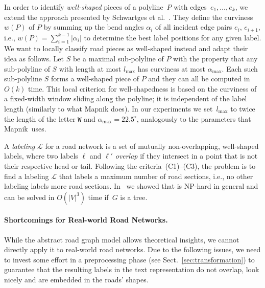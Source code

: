 \documentclass[a4paper,11pt]{article}
\begin{document}
In order to identify \emph{well-shaped} pieces of a polyline~$P$ with
edges~$e_1,\dots,e_k$, we extend the approach presented
by Schwartges et al.~\cite{swh-lsime-acm14}. They define the curviness $w(P)$
of $P$ by summing up the bend angles $\alpha_i$ of all incident edge pairs
$e_i$, $e_{i+1}$, i.e., $w(P)=\sum_{i=1}^{k-1}|\alpha_i|$ to determine the best label positions for any given label. We want to locally classify road pieces as well-shaped instead and adapt their idea as follows. 
Let $S$ be a maximal sub-polyline of $P$ with the property that any sub-polyline of $S$ with length at most $l_\text{max}$ has curviness at most $\alpha_\text{max}$. Each such sub-polyline $S$ forms a well-shaped piece of $P$ and they can all be computed in $O(k)$ time. 
This local criterion for well-shapedness is based on the curviness of a fixed-width window sliding along the polyline; it is independent of the label length (similarly to what Mapnik does). 
In our experiments we set~$l_\text{max}$ to twice the length of the
letter \texttt{W} and $\alpha_\text{max}=22.5^\circ$, analogously to the parameters that Mapnik~uses.

A \emph{labeling} $\mathcal L$ for a road network is a set of mutually
non-overlapping, well-shaped labels, where two labels $\ell$ and
$\ell'$ \emph{overlap} if they intersect in a point that is not their
respective head or tail. 
Following the criteria~(C1)--(C3), the problem
\MaxTotalCovering is to find a labeling $\mathcal L$ that labels a
maximum number of road sections, i.e., no other labeling 
labels more road sections.  In~\cite{rlTheory} we showed that
\MaxTotalCovering is NP-hard in general and can be solved in
$O(|V|^3)$ time if~$G$ is a tree.










\paragraph{Shortcomings for Real-world Road Networks.}\label{sec:issues} 
While the abstract road graph model allows theoretical insights, we
cannot directly apply it to real-world road networks. Due to the following
issues, we need to invest some effort in a preprocessing phase (see Sect.~\ref{sec:transformation}) to guarantee that the resulting
labels in the text representation do not overlap, look nicely and are embedded in the roads' shapes. 
\end{document}
